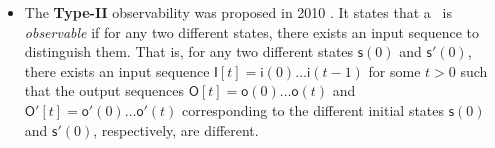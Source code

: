\begin{itemize}
\item The  {\bf Type-II} observability was proposed in 2010 \cite{Zhao2010Input}. It states that a \BCN\  is {\em observable} if for any two different states, there exists an input sequence  to  distinguish them. That is,  for any two different states $\mathsf{s}(0)$ and $\mathsf{s}'(0)$, there exists an input sequence  $\mathsf{I}[t]=\mathsf{i}(0)\ldots\mathsf{i}(t-1)$ for some $t>0$ such that the output sequences $\mathsf{O}[t]=\mathsf{o}(0)\ldots\mathsf{o}(t)$ and  $\mathsf{O}'[t]=\mathsf{o}'(0)\ldots\mathsf{o}'(t)$ corresponding to  the different initial states  $\mathsf{s}(0)$ and $\mathsf{s}'(0)$, respectively, are different.
	
	

\end{itemize}
